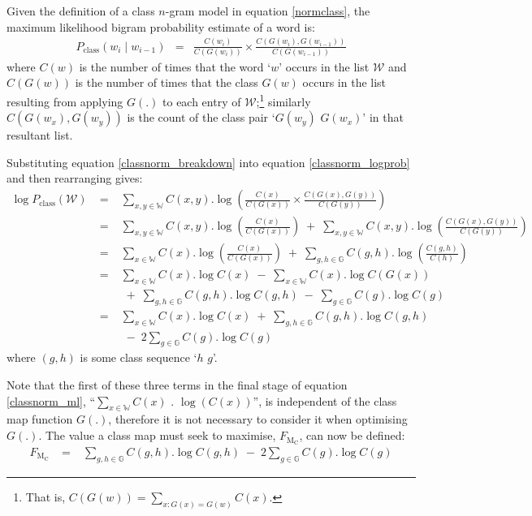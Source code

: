 Given the definition of a class $n$-gram model in equation
\ref{normclass}, the maximum likelihood bigram
probability estimate of a word is:
\begin{eqnarray}
P_\mathrm{class}(w_i \;|\; w_{i-1}) & = &
 \frac{C(w_i)}{C(G(w_i))}
  \times
  \frac{C\left(G(w_i), G(w_{i-1})\right)}
       {C(G(w_{i-1}))} \label{classnorm_breakdown}
\end{eqnarray}
where $C(w)$ is the number of times that the word `$w$' occurs in the
list $\mathcal{W}$ and $C(G(w))$ is the number of times that the class
$G(w)$ occurs in the list resulting from applying $G(.)$ to each entry
of $\mathcal{W}$;\footnote{That is, $C(G(w))=\sum_{x:
G(x)=G(w)}C(x)$.}  similarly $C(G(w_x), G(w_y))$ is the count of the
class pair `$G(w_y)$ $G(w_x)$' in that resultant list.

Substituting equation \ref{classnorm_breakdown} into equation \ref{classnorm_logprob}
and then rearranging gives:
\begin{eqnarray}
\log P_\mathrm{class}(\mathcal{W}) & \;=\; &
\sum_{x,y \in \mathbb{W}} C(x,y) . \log\left(
  \frac{C(x)}{C(G(x))} \times \frac{C(G(x),G(y))}{C(G(y))} 
  \right) \nonumber
\\
&\;=\;& \sum_{x,y \in \mathbb{W}} C(x,y) . \log
  \left(\frac{C(x)}{C(G(x))}\right)
 \;+\; \sum_{x,y \in \mathbb{W}} C(x,y)
  . \log\left(\frac{C(G(x),G(y))}{C(G(y))}\right) \nonumber
\\
&\;=\;& \sum_{x \in \mathbb{W}} C(x) . \log \left(\frac{C(x)}{C(G(x))}\right)
 \;+\; \sum_{g,h \in \mathbb{G}} C(g,h) . \log\left(\frac{C(g,h)}{C(h)}\right)
  \nonumber
\\
&\;=\;& \sum_{x \in \mathbb{W}} C(x) . \log C(x)
 \;-\; \sum_{x \in \mathbb{W}} C(x) . \log C(G(x))\nonumber\\
&&\;+\; \sum_{g,h \in \mathbb{G}} C(g,h) . \log C(g,h)
 \;-\; \sum_{g \in \mathbb{G}} C(g) . \log C(g) \nonumber
\\
&\;=\;& \sum_{x \in \mathbb{W}} C(x) . \log C(x)
 \;+\; \sum_{g,h \in \mathbb{G}} C(g,h) . \log C(g,h)\nonumber\\
&&\;-\; 2 \sum_{g \in \mathbb{G}} C(g) . \log C(g)\label{classnorm_ml}
\end{eqnarray}
where $(g,h)$ is some class sequence `$h$ $g$'.

Note that the first of these three terms in the final stage of equation
\ref{classnorm_ml}, ``$\sum_{x \in \mathbb{W}} C(x)$ $.$ $\log(C(x))$'', is
independent of the class map function $G(.)$, therefore it is not
necessary to consider it when optimising $G(.)$.  The value a class
map must seek to maximise, $F_{\mathrm{M}_\mathrm{C}}$, can now be defined:
\begin{eqnarray}
F_{\mathrm{M}_\mathrm{C}}
&\;=\;&
 \sum_{g,h \in \mathbb{G}} C(g,h) . \log C(g,h)
\;-\; 2 \sum_{g \in \mathbb{G}} C(g) . \log C(g)\label{classnorm_Fml}
\end{eqnarray}

